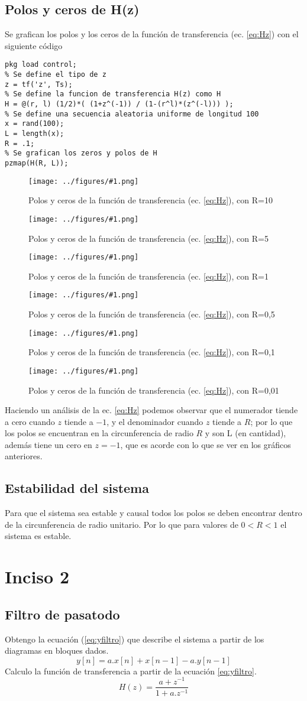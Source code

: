 \documentclass[letterpaper, 10 pt, conference]{ieeeconf}  %
\newcommand{\image}[2] {
  \begin{figure}[H]
    \centering
    \texttt{[image: ../figures/\#1.png]}
    \caption{#2}
    \label{fig:#1}
  \end{figure}
}
\begin{document}
\subsection{Polos y ceros de H(z)}
Se grafican los polos y los ceros de la funci\'on de transferencia (ec. \ref{eq:Hz}) con el siguiente c\'odigo
\begin{lstlisting}[style=Matlab-editor]
% tf y pzmap son del paquete de control
pkg load control;
% Se define el tipo de z
z = tf('z', Ts);
% Se define la funcion de transferencia H(z) como H
H = @(r, l) (1/2)*( (1+z^(-1)) / (1-(r^l)*(z^(-l))) );
% Se define una secuencia aleatoria uniforme de longitud 100
x = rand(100);
L = length(x);
R = .1;
% Se grafican los zeros y polos de H
pzmap(H(R, L));
\end{lstlisting}

\image{Hz-pzmap-1}{Polos y ceros de la función de transferencia (ec. \ref{eq:Hz}), con R=10}
\image{Hz-pzmap-2}{Polos y ceros de la función de transferencia (ec. \ref{eq:Hz}), con R=5}
\image{Hz-pzmap-3}{Polos y ceros de la función de transferencia (ec. \ref{eq:Hz}), con R=1}
\image{Hz-pzmap-4}{Polos y ceros de la función de transferencia (ec. \ref{eq:Hz}), con R=0,5}
\image{Hz-pzmap-5}{Polos y ceros de la función de transferencia (ec. \ref{eq:Hz}), con R=0,1}
\image{Hz-pzmap-6}{Polos y ceros de la función de transferencia (ec. \ref{eq:Hz}), con R=0,01}

Haciendo un an\'alisis de la ec. \ref{eq:Hz} podemos observar que el numerador tiende a cero cuando $z$ tiende a $-1$, y el denominador cuando $z$ tiende a $R$; por lo que los polos se encuentran en la circunferencia de radio $R$ y son L (en cantidad), adem\'as tiene un cero en $z=-1$, que es acorde con lo que se ver en los gr\'aficos anteriores.

\subsection{Estabilidad del sistema}
Para que el sistema sea estable y causal todos los polos se deben encontrar dentro de la circunferencia de radio unitario. Por lo que para valores de $0<R<1$ el sistema es estable.

\section{Inciso 2}
\subsection{Filtro de pasatodo}
Obtengo la ecuación (\ref{eq:yfiltro}) que describe el sistema a partir de los diagramas en bloques dados.
\begin{equation} \label{eq:yfiltro}
  y[n] = a.x[n] + x[n-1] - a.y[n-1]
\end{equation}
Calculo la función de transferencia a partir de la ecuación \ref{eq:yfiltro}.
\begin{equation} \label{eq:Hfiltro}
  H(z) = \frac{a + z^{-1}}{1+a.z^{-1}}
\end{equation}
\end{document}

